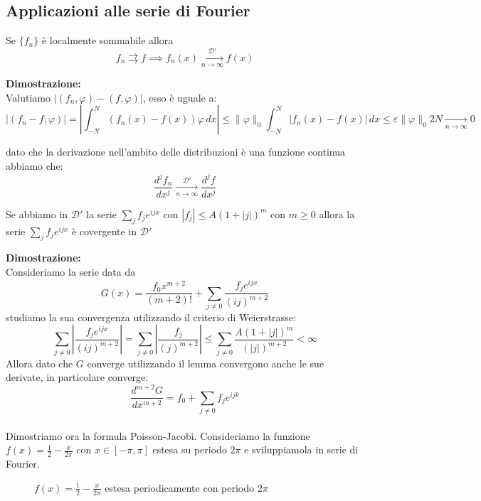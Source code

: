 \subsection{Applicazioni alle serie di Fourier}
\begin{lem}
Se $\{f_n\}$ è localmente sommabile allora 
\[f_n \rightrightarrows f \implies f_n(x) \xrightarrow[n\to \infty]{\mathcal{D}'} f(x)\]
\end{lem}
\hspace{-1.6em}\textbf{Dimostrazione:}\\
Valutiamo $|(f_n,\varphi)-(f,\varphi)|$, esso è uguale a:
\[|(f_n-f,\varphi)| = \left|\int_{-N}^N (f_n(x)-f(x))\varphi\,dx\right| \leq \|\varphi\|_0 \int_{-N}^N |f_n(x)-f(x)|\,dx \leq \varepsilon  \|\varphi\|_0 2N  \xrightarrow[n\to \infty]{} 0\]
\begin{coro}
dato che la derivazione nell'ambito delle distribuzioni è una funzione continua abbiamo che:
\[\frac{d^j f_n}{dx^j} \xrightarrow[n\to \infty]{\mathcal{D}'} \frac{d^j f}{dx^j}\]
\end{coro}
\begin{thm}
Se abbiamo in $\mathcal{D}'$ la serie $\displaystyle\sum_jf_je^{ijx}$ con $|f_j|\leq A(1+|j|)^m$ con $m\geq0$ allora la serie $\displaystyle\sum_jf_je^{ijx}$ è covergente in $\mathcal{D}'$
\end{thm}
\hspace{-1.6em}\textbf{Dimostrazione:}\\
Consideriamo la serie data da
\[G(x) = \frac{f_0 x^{m+2}}{(m+2)!}+\sum_{j\neq0} \frac{f_je^{ijx}}{(ij)^{m+2}}\]
studiamo la sua convergenza utilizzando il criterio di Weierstrasse:
\[\sum_{j\neq0}\left| \frac{f_je^{ijx}}{(ij)^{m+2}}\right| = \sum_{j\neq0}\left| \frac{f_j}{(j)^{m+2}}\right|\leq \sum_{j\neq0}\frac{A(1+|j|)^m}{(|j|)^{m+2}}<\infty\]
Allora dato che $G$ converge utilizzando il lemma convergono anche le sue derivate, in particolare converge:
\[\frac{d^{m+2}G}{dx^{m+2}} = f_0 + \sum_{j\neq0} f_je^{ijk}\]
\\
\newline Dimostriamo ora la formula Poisson-Jacobi. Consideriamo la funzione $f(x) = \frac{1}{2}-\frac{x}{2\pi}$ con $x\in[-\pi,\pi]$ estesa su periodo $2\pi$ e sviluppiamola in serie di Fourier.
\begin{figure}[H]
\centering
{}
\caption{$f(x) = \frac{1}{2}-\frac{x}{2\pi}$ estesa periodicamente con periodo $2\pi$}
\label{serie}
\end{figure}
